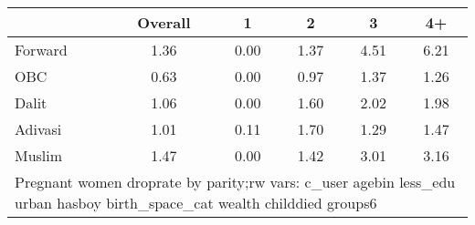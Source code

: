 \begin{tabular}{l*{5}{c}}
\toprule
            &\multicolumn{1}{c}{Overall}&\multicolumn{1}{c}{1}&\multicolumn{1}{c}{2}&\multicolumn{1}{c}{3}&\multicolumn{1}{c}{4+}\\
\midrule
\midrule
Forward     &        1.36&        0.00&        1.37&        4.51&        6.21\\
OBC         &        0.63&        0.00&        0.97&        1.37&        1.26\\
Dalit       &        1.06&        0.00&        1.60&        2.02&        1.98\\
Adivasi     &        1.01&        0.11&        1.70&        1.29&        1.47\\
Muslim      &        1.47&        0.00&        1.42&        3.01&        3.16\\
\bottomrule
\multicolumn{6}{l}{\footnotesize Pregnant women droprate by parity;\n rw vars: c\_user agebin less\_edu urban hasboy birth\_space\_cat wealth childdied groups6}\\
\end{tabular}
